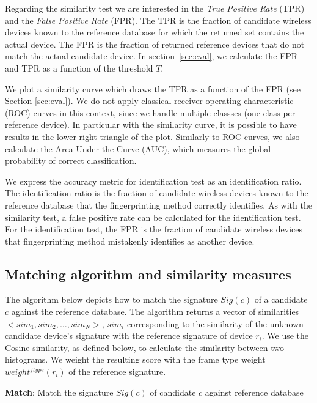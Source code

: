 \documentclass[10pt, conference, compsocconf, letterpaper]{IEEEtran}
\begin{document}
Regarding the similarity test we are interested in the {\em True Positive Rate} (TPR) and the {\em False Positive Rate} (FPR).
The TPR is the fraction of candidate wireless devices known to the reference database 
for which the returned set contains the actual device.
The FPR is the fraction of returned reference devices that do not match the actual candidate device.
In section~\ref{sec:eval}, we calculate the FPR and TPR as a function of the threshold $T$.

We plot a similarity curve which draws the TPR as a function of the FPR (see Section \ref{sec:eval}). We do not apply classical receiver operating characteristic (ROC) curves in this context, since we handle multiple classses (one class per reference device). In particular with the similarity curve, it is possible to have results in the lower right triangle of the plot.
Similarly to ROC curves, we also calculate the Area Under the Curve (AUC), which measures the global probability of correct classification.




We express the accuracy metric for identification test as an identification ratio. The identification ratio is the fraction of candidate wireless devices 
known to the reference database that the fingerprinting method correctly identifies. 
As with the similarity test, a false positive rate can be calculated for the identification test. 
For the identification test, the FPR is the fraction of candidate wireless devices that fingerprinting method mistakenly identifies as another 
device.


\subsection{Matching algorithm and similarity measures}
\label{sec:simil}

The algorithm below depicts how to match the signature $Sig(c)$ of a candidate $c$ against the reference database.
The algorithm returns a vector of similarities $<sim_1,sim_2,\ldots,sim_N>$, $sim_i$ corresponding 
to the similarity of the unknown candidate device's signature with the reference signature of device $r_i$.
We use the Cosine-similarity, as defined below, to calculate the similarity between two histograms.
We weight the resulting score with the frame type weight $weight^{ftype}(r_i)$ of the reference signature.


\begin{algorithm}[h!]
\begin{algorithmic}[]
{\footnotesize
\caption{{\bf Match}: Match the signature $Sig(c)$ of candidate $c$ against reference database}
\ENDFOR
\ENDFOR
{}
}
\end{algorithmic}
\label{matchalgo}
\end{algorithm}
\end{document}
